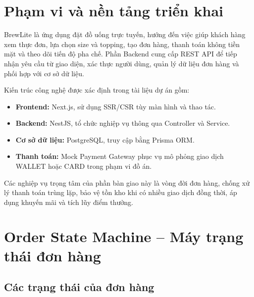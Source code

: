 
\label{chap:backend-handover}

\section{Phạm vi và nền tảng triển khai}

BrewLite là ứng dụng đặt đồ uống trực tuyến, hướng đến việc giúp khách hàng xem thực đơn, lựa chọn size và topping, tạo đơn hàng, thanh toán không tiền mặt và theo dõi tiến độ pha chế. Phần Backend cung cấp REST API để tiếp nhận yêu cầu từ giao diện, xác thực người dùng, quản lý dữ liệu đơn hàng và phối hợp với cơ sở dữ liệu.

Kiến trúc công nghệ được xác định trong tài liệu dự án gồm:
\begin{itemize}
    \item \textbf{Frontend:} Next.js, sử dụng SSR/CSR tùy màn hình và thao tác.
    \item \textbf{Backend:} NestJS, tổ chức nghiệp vụ thông qua Controller và Service.
    \item \textbf{Cơ sở dữ liệu:} PostgreSQL, truy cập bằng Prisma ORM.
    \item \textbf{Thanh toán:} Mock Payment Gateway phục vụ mô phỏng giao dịch WALLET hoặc CARD trong phạm vi đồ án.
\end{itemize}

Các nghiệp vụ trọng tâm của phần bàn giao này là vòng đời đơn hàng, chống xử lý thanh toán trùng lặp, bảo vệ tồn kho khi có nhiều giao dịch đồng thời, áp dụng khuyến mãi và tích lũy điểm thưởng.

\section{Order State Machine -- Máy trạng thái đơn hàng}
\label{sec:order-state-machine}

\subsection{Các trạng thái của đơn hàng}

